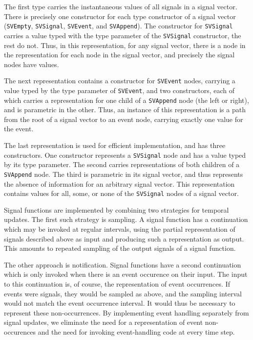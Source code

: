 The first type carries the instantaneous values of all signals in a signal vector.
There is precisely one constructor for each type constructor of a signal vector ({\tt SVEmpty},
{\tt SVSignal}, {\tt SVEvent}, and {\tt SVAppend}). The constructor for {\tt SVSignal}
carries a value typed with the type parameter of the {\tt SVSignal} constructor,
the rest do not. Thus, in this representation, for any signal vector, there is
a node in the representation for each node in the signal vector, and precisely
the signal nodes have values.

The next representation contains a constructor for {\tt SVEvent} nodes, carrying
a value typed by the type parameter of {\tt SVEvent}, and two constructors, each
of which carries a representation for one child of a {\tt SVAppend} node (the
left or right), and is parametric in the other. Thus, an instance of this
representation is a path from the root of a signal vector to an event node,
carrying exactly one value for the event.

The last representation is used for efficient implementation, and has three
constructors. One constructor represents a {\tt SVSignal} node and has a value
typed by its type parameter. The second carries representations of both
children of a {\tt SVAppend} node. The third is parametric in its signal vector,
and thus represents the absence of information for an arbitrary signal vector.
This representation contains values for all, some, or none of the {\tt SVSignal}
nodes of a signal vector.

Signal functions are implemented by combining two strategies for temporal
updates. The first such strategy is sampling. A signal function has a 
continuation which may be invoked at regular intervals, using the partial
representation of signals described above as input and producing such a
representation as output. This amounts to repeated sampling of the output
signals of a signal function.

The other approach is notification. Signal functions have a second continuation
which is only invoked when there is an event occurence on their input. The input
to this continuation is, of course, the representation of event occurrences. If
events were signals, they would be sampled as above, and the sampling interval
would not match the event occurrence interval. It would thus be necessary to
represent these non-occurrences. By implementing event handling separately from
signal updates, we eliminate the need for a representation of event
non-occurences and the need for invoking event-handling code at every time step.

